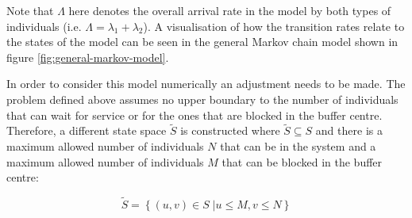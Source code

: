 Note that \(\Lambda\) here denotes the overall arrival rate in the model by both 
types of individuals (i.e. \(\Lambda = \lambda_1 + \lambda_2\)). 
A visualisation of how the transition rates relate to the states of the model 
can be seen in the general Markov chain model shown in figure 
\ref{fig:general-markov-model}.




In order to consider this model numerically an adjustment needs to be made. 
The problem defined above assumes no upper boundary to the number of individuals 
that can wait for service or for the ones that are blocked in the buffer centre. 
Therefore, a different state space \( \tilde S \) is constructed where 
\( \tilde S \subseteq S \) and there is a maximum allowed number of individuals 
\(N\) that can be in the system and a maximum allowed number of individuals 
\(M\) that can be blocked in the buffer centre:

\begin{equation}
    \tilde S = \left\{ (u, v) \in S\;| u \leq M, v\leq N \right\}
\end{equation}





